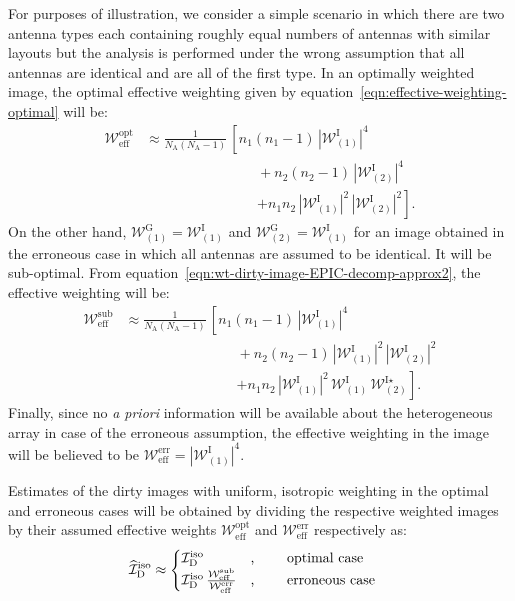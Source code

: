 \documentclass[a4paper,fleqn,usenatbib]{mnras}
\newcommand{\Nant}{N_\textrm{A}}
\begin{document}
For purposes of illustration, we consider a simple scenario in which there are two antenna types each containing roughly equal numbers of antennas with similar layouts but the analysis is performed under the wrong assumption that all antennas are identical and are all of the first type. In an optimally weighted image, the optimal effective weighting given by equation~\ref{eqn:effective-weighting-optimal} will be:
\begin{align}\label{eqn:effective-weighting-optimal-example}
  \mathcal{W}_\textrm{eff}^\textrm{opt} &\approx \frac{1}{\Nant(\Nant-1)}\,\left[n_1(n_1-1)\,\left|\mathcal{W}^\textrm{I}_{(1)}\right|^4 \right.\nonumber\\
  &\qquad\qquad\qquad\qquad + n_2(n_2-1)\,\left|\mathcal{W}^\textrm{I}_{(2)}\right|^4 \nonumber\\
  &\qquad\qquad\qquad\qquad \left. + n_1n_2\,\left|\mathcal{W}^\textrm{I}_{(1)}\right|^2\,\left|\mathcal{W}^\textrm{I}_{(2)}\right|^2\right].
\end{align}
On the other hand, $\mathcal{W}^\textrm{G}_{(1)} = \mathcal{W}^\textrm{I}_{(1)}$ and $\mathcal{W}^\textrm{G}_{(2)} = \mathcal{W}^\textrm{I}_{(1)}$ for an image obtained in the erroneous case in which all antennas are assumed to be identical. It will be sub-optimal. From equation~\ref{eqn:wt-dirty-image-EPIC-decomp-approx2}, the effective weighting will be:
\begin{align}\label{eqn:effective-weighting-suboptimal-example}
  \mathcal{W}_\textrm{eff}^\textrm{sub} &\approx \frac{1}{\Nant(\Nant-1)}\,\left[n_1(n_1-1)\,\left|\mathcal{W}^\textrm{I}_{(1)}\right|^4\right.\nonumber\\
  &\qquad\qquad\qquad\qquad + n_2(n_2-1)\,\left|\mathcal{W}^\textrm{I}_{(1)}\right|^2\,\left|\mathcal{W}^\textrm{I}_{(2)}\right|^2 \nonumber\\
  &\qquad\qquad\qquad\qquad \left. + n_1n_2\,\left|\mathcal{W}^\textrm{I}_{(1)}\right|^2 \,\mathcal{W}^\textrm{I}_{(1)}\,\mathcal{W}^{\textrm{I}\star}_{(2)}\right].
\end{align}
Finally, since no {\it a priori} information will be available about the heterogeneous array in case of the erroneous assumption, the effective weighting in the image will be believed to be $\mathcal{W}_\textrm{eff}^\textrm{err} = \left|\mathcal{W}_{(1)}^\textrm{I}\right|^4$. 

Estimates of the dirty images with uniform, isotropic weighting in the optimal and erroneous cases will be obtained by dividing the respective weighted images by their assumed effective weights $\mathcal{W}_\textrm{eff}^\textrm{opt}$ and $\mathcal{W}_\textrm{eff}^\textrm{err}$ respectively as:
\begin{align}
  \widehat{\mathcal{I}}_\textrm{D}^\textrm{iso} &\approx \begin{cases}
    \mathcal{I}_\textrm{D}^\textrm{iso} &\textrm{, \qquad optimal case} \\
    \mathcal{I}_\textrm{D}^\textrm{iso}\,\frac{\mathcal{W}_\textrm{eff}^\textrm{sub}}{\mathcal{W}_\textrm{eff}^\textrm{err}} &\textrm{, \qquad erroneous case}
  \end{cases}
\end{align}
\end{document}
